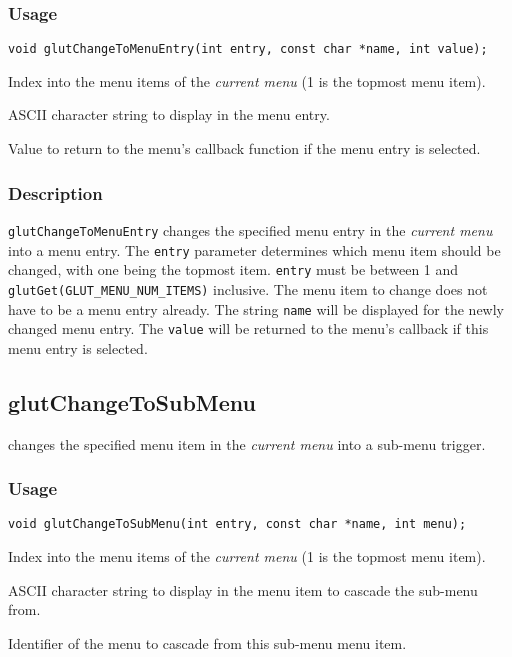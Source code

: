 \subsubsection*{Usage}
\begin{verbatim}
void glutChangeToMenuEntry(int entry, const char *name, int value);
\end{verbatim}
\begin{description}
\itemsep 0in
\item[{\tt entry}]
Index into the menu items of the {\em current menu} (1 is the topmost
menu item).
\item[{\tt name}]
ASCII character string to display in the menu entry.
\item[{\tt value}]
Value to return to the menu's callback function if the menu entry is selected.
\end{description}

\subsubsection*{Description}

{\tt glutChangeToMenuEntry} changes the specified menu entry in the {\em current
menu} into a menu entry.  The {\tt entry} parameter determines which menu
item should be changed, with one being the topmost item.  
{\tt entry} must be between 1 and {\tt glutGet(GLUT\_MENU\_NUM\_ITEMS)}
inclusive.
The menu item to
change does not have to be a menu entry already.  The string {\tt name}
will be displayed for the newly changed menu entry.  The {\tt value}
will be returned to the menu's callback if this menu entry is selected.

\subsection{glutChangeToSubMenu}

 changes the specified menu item in the {\em
current menu} into a sub-menu trigger.

\subsubsection*{Usage}
\begin{verbatim}
void glutChangeToSubMenu(int entry, const char *name, int menu);
\end{verbatim}
\begin{description}
\itemsep 0in
\item[{\tt entry}]
Index into the menu items of the {\em current menu} (1 is the topmost
menu item).
\item[{\tt name}]
ASCII character string to display in the menu item to cascade the sub-menu from.
\item[{\tt menu}]
Identifier of the menu to cascade from this sub-menu menu item.
\end{description}

